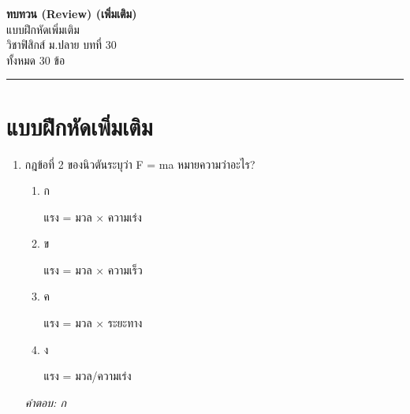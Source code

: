 \documentclass[12pt]{article}
\begin{document}
\begin{center}
{\Large\textbf{ทบทวน (Review) (เพิ่มเติม)}}\\[6pt]
{\normalsize แบบฝึกหัดเพิ่มเติม}\\[6pt]
{\normalsize วิชาฟิสิกส์ ม.ปลาย บทที่ 30}\\[4pt]
{\footnotesize ทั้งหมด 30 ข้อ}
\end{center}
\hrule
\bigskip

\section*{แบบฝึกหัดเพิ่มเติม}
\begin{enumerate}[label=\arabic*., itemsep=0.5\baselineskip, topsep=0.5\baselineskip, leftmargin=*]
\item กฎข้อที่ 2 ของนิวตันระบุว่า F = ma หมายความว่าอะไร?
\begin{enumerate}[label=\alph*)., itemsep=0.3\baselineskip, topsep=0.3\baselineskip]
\item ก\ 
\begin{minipage}[t]{0.9\linewidth}
\raggedright แรง = มวล × ความเร่ง
\end{minipage}
\item ข\ 
\begin{minipage}[t]{0.9\linewidth}
\raggedright แรง = มวล × ความเร็ว
\end{minipage}
\item ค\ 
\begin{minipage}[t]{0.9\linewidth}
\raggedright แรง = มวล × ระยะทาง
\end{minipage}
\item ง\ 
\begin{minipage}[t]{0.9\linewidth}
\raggedright แรง = มวล/ความเร่ง
\end{minipage}
\end{enumerate}
\vspace{-0.3\baselineskip}
\begin{small}
\textit{คำตอบ: ก}
\end{small}


\end{enumerate}
\end{document}
